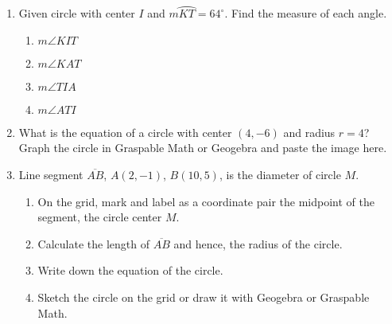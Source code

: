 \documentclass[12pt, twoside]{article}
\begin{document}
\begin{enumerate}
\newpage
\item Given circle with center $I$ and $m \wideparen{KT}=64^\circ$. Find the measure of each angle.
  \begin{multicols}{2}
    \raggedcolumns
    \begin{enumerate}[itemsep=1cm]
      \item $m\angle KIT$
      \item $m\angle KAT$
      \item $m\angle TIA$
      \item $m\angle ATI$
    \end{enumerate}
  \end{multicols}

\newpage
\item What is the equation of a circle with center $(4,-6)$ and radius $r=4$?\\[0.5cm]
  Graph the circle in Graspable Math or Geogebra and paste the image here.

\newpage
\item Line segment $\overline{AB}$, $A(2,-1)$, $B(10,5)$, is the diameter of circle $M$. 
\begin{enumerate}
  \item On the grid, mark and label as a coordinate pair the midpoint of the segment, the circle center $M$. 
  \item Calculate the length of $\overline{AB}$ and hence, the radius of the circle.\
  \item Write down the equation of the circle. 
  \item Sketch the circle on the grid or draw it with Geogebra or Graspable Math.
\end{enumerate}


\end{enumerate}
\end{document}
